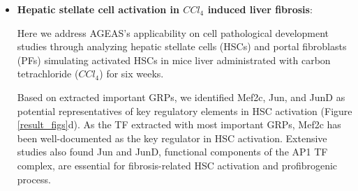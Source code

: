 \documentclass[fleqn,10pt]{wlscirep}
\begin{document}
\begin{itemize}

      \item {\textbf{Hepatic stellate cell activation in $CCl_4$ induced liver fibrosis}}:

        Here we address AGEAS's applicability on cell pathological development studies through analyzing hepatic stellate cells (HSCs) and portal fibroblasts (PFs) simulating activated HSCs in mice liver administrated with carbon tetrachloride ($CCl_4$) for six weeks.

        Based on extracted important GRPs, we identified Mef2c, Jun, and JunD as potential representatives of key regulatory elements in HSC activation (Figure \ref{result_figs}d).
        As the TF extracted with most important GRPs, Mef2c has been well-documented as the key regulator in HSC activation. \cite{mef2c_1, mef2c_2, mef2c_3}
        Extensive studies also found Jun and JunD, functional components of the AP1 TF complex, are essential for fibrosis-related HSC activation and profibrogenic process. \cite{ap1_hsc_1, ap1_hsc_2, ap1_hsc_3, ap1_hsc_4}


\end{itemize}
\end{document}
